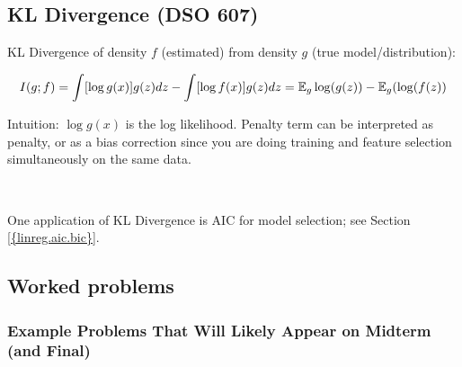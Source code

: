%
%
%
%



\subsection{KL Divergence (DSO 607)}\label{prob.kl.divergence}

KL Divergence of density \(f\) (estimated) from density \(g\) (true model/distribution):

\[
I(g; f) = \int[\log g(x) ] g(z) dz - \int [\log f(x)] g(z) dz = \E_g \log(g(z)) - \E_g(\log(f(z))
\]

Intuition: \(\log g(x)\) is the log likelihood. Penalty term can be interpreted as penalty, or as a bias correction since you are doing training and feature selection simultaneously on the same data.

\

One application of KL Divergence is AIC for model selection; see Section \ref{{linreg.aic.bic}}.

%
%
%
%
%
%
%
\subsection{Worked problems}

\subsubsection{Example Problems That Will Likely Appear on Midterm (and Final)}

%
%
%
%
%
%
%
%

